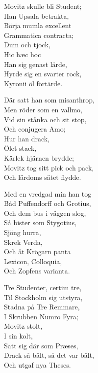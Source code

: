 \vspace{10pt}
Movitz skulle bli Student;\\
Han Upsala betrakta,\\
Börja mumla excellent\\
Grammatica contracta;\\
	Dum och tjock,\\
	Hic hæc hoc\\
	Han sig genast lärde,\\
Hyrde sig en svarter rock,\\
Kyronii öl förtärde.\par
\vspace{10pt}
Där satt han som misanthrop,\\
Men röder som en vallmo,\\
Vid sin stånka och sit stop,\\
Och conjugera Amo;\\
	Hur han drack,\\
	Ölet stack,\\
	Kärlek hjärnen brydde;\\
Movitz tog sitt pick och pack,\\
Och lärdoms sätet flydde.\par
\vspace{10pt}
Med en vredgad min han tog\\
Båd Puffendorff och Grotius,\\
Och dem bus i väggen slog,\\
Så bister som Stygotius,\\
	Sjöng hurra,\\
	Skrek Verda,\\
	Och åt Krögarn panta\\
Lexicon, Colloquia,\\
Och Zopfens varianta.\par
\vspace{10pt}
Tre Studenter, certim tre,\\
Til Stockholm sig utstyra,\\
Stadna på Tre Remmare,\\
I Skrubben Numro Fyra;\\
	Movitz stolt,\\
	I sin kolt,\\
	Satt sig där som Præses,\\
Drack så bålt, så det var bålt,\\
Och utgaf nya Theses.\par

